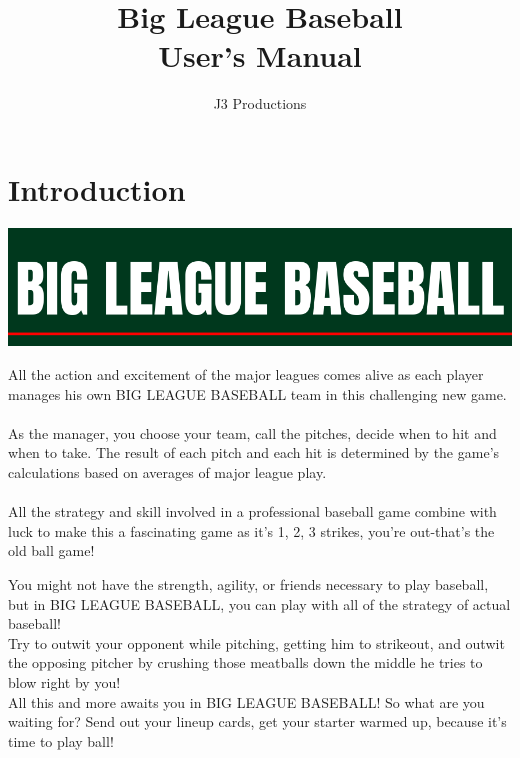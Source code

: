 \documentclass[12pt,a4paper]{report}
\title{{\Huge Big League Baseball \\\bigskip User's Manual}}
\author{{\LARGE J3 Productions}}
\date{\vspace{-5ex}}
\begin{document}
\maketitle

\tableofcontents
\newpage

\chapter{Introduction}
\begin{center}
	\includegraphics[width=1\linewidth]{umInclude/title}
\end{center}

\begin{displayquote}
	All the action and excitement of the major leagues comes alive as each player manages his own BIG LEAGUE BASEBALL team in this challenging new game.\\\\
	As the manager, you choose your team, call the pitches, decide when to hit and when to take. The result of each pitch and each hit is determined by the game's calculations based on averages of major league play.\\\\
	All the strategy and skill involved in a professional baseball game combine with luck to make this a fascinating game as it's 1, 2, 3 strikes, you're out-that's the old ball game!
\end{displayquote}

You might not have the strength, agility, or friends necessary to play baseball, but in BIG LEAGUE BASEBALL, you can play with all of the strategy of actual baseball!\\

Try to outwit your opponent while pitching, getting him to strikeout, and outwit the opposing pitcher by crushing those meatballs down the middle he tries to blow right by you!\\

All this and more awaits you in BIG LEAGUE BASEBALL! So what are you waiting for? Send out your lineup cards, get your starter warmed up, because it's time to play ball!
\end{document}

